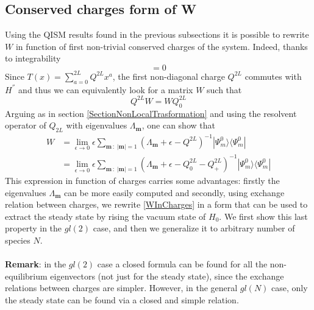 \documentclass[10pt]{article}
\numberwithin{equation}{section}
\numberwithin{equation}{subsection}
\begin{document}
\subsection{Conserved charges form of W}
Using the QISM results found in the previous subsections it is possible to rewrite $W$ in function of first non-trivial conserved charges of the system. Indeed, thanks to integrability
\begin{equation}
	[H^{''},T(x)]=0
\end{equation}
Since $T(x)=\sum_{a=0}^{2L}Q^{2L}x^{a}$, the first non-diagonal charge $Q^{2L}$ commutes with $H^{''}$ and thus we can equivalently look for a matrix $W$ such that 
\begin{equation}
	Q^{2L}W=WQ_{0}^{2L}
\end{equation}
Arguing as in section \ref{SectionNonLocalTrasformation} and using the resolvent operator of $Q_{2L}$ with eigenvalues $\Lambda_{\bm{m}}$, one can show that 
\begin{equation}\label{WInCharges}
	\begin{split}
	W&=\lim_{\epsilon\to 0}\epsilon\sum_{\bm{m}\,:\;|\bm{m}|=1}\left(\Lambda_{\bm{m}}+\epsilon-Q^{2L}\right)^{-1}|\Psi_{m}^{0}\rangle\langle \Psi_{m}^{0}|\\&=\lim_{\epsilon\to 0}\epsilon\sum_{\bm{m}\,:\;|\bm{m}|=1}\left(\Lambda_{\bm{m}}+\epsilon-Q^{2L}_{0}-Q_{+}^{2L}\right)^{-1}|\Psi_{m}^{0}\rangle\langle \Psi_{m}^{0}|
\end{split}
\end{equation}
This expression in function of charges carries some advantages: firstly the eigenvalues $\Lambda_{\bm{m}}$ can be more easily computed and secondly, using exchange relation between charges, we rewrite \eqref{WInCharges} in a form that can be used to extract the steady state by rising the vacuum state of $H_{0}$. We first show this last property in the $gl(2)$ case, and then we generalize it to arbitrary number of species $N$.\\ \\
\textbf{Remark}: in the $gl(2)$ case a closed formula can be found for all the non-equilibrium eigenvectors (not just for the steady state), since the exchange relations between charges are simpler. However, in the general $gl(N)$ case, only the steady state can be found via a closed and simple relation. 
\end{document}
